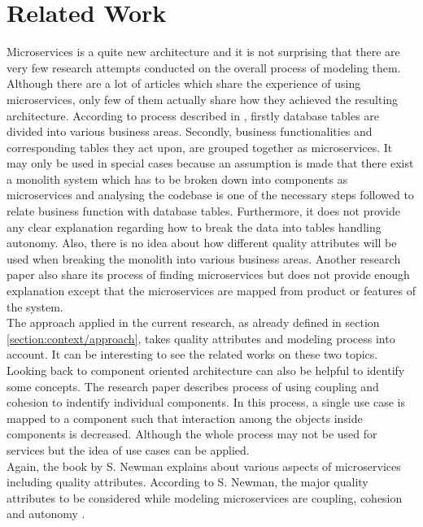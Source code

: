 \chapter{Related Work}\label{chapter:related_work}
Microservices is a quite new architecture and it is not surprising that there are very few research attempts conducted on the overall process of modeling them. Although there are a lot of articles which share the experience of using microservices, only few of them actually share how they achieved the resulting architecture. According to process described in \cite{Levcovitz:2014aa}, firstly database tables are divided into various business areas. Secondly, business functionalities and corresponding tables they act upon, are grouped together as microservices. It may only be used in special cases because an assumption is made that there exist a monolith system which has to be broken down into components as microservices and analysing the codebase is one of the necessary steps followed to relate business function with database tables. Furthermore, it does not provide any clear explanation regarding how to break the data into tables handling autonomy. Also, there is no idea about how different quality attributes will be used when breaking the monolith into various business areas. Another research paper \cite{Bruggemann:2013aa} also share its process of finding microservices but does not provide enough explanation except that the microservices are mapped from product or features of the system.
\\
The approach applied in the current research, as already defined in section \ref{section:context/approach}, takes quality attributes and modeling process into account. It can be interesting to see the related works on these two topics.\\
Looking back to component oriented architecture can also be helpful to identify some concepts. The research paper \cite{Lee:2001aa} describes process of using coupling and cohesion to indentify individual components. In this process, a single use case is mapped to a component such that interaction among the objects inside components is decreased. Although the whole process may not be used for services but the idea of use cases can be applied.\\
Again, the book by S. Newman explains about various aspects of microservices including quality attributes. According to S. Newman, the major quality attributes to be considered while modeling microservices are coupling, cohesion and autonomy \cite{Newman:2015aa}.\\
